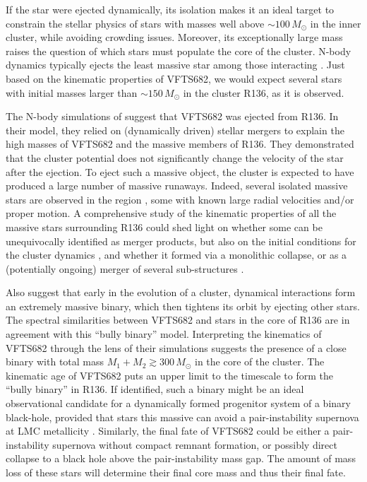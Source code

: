 \documentclass[a4paper,fleqn,usenatbib]{mnras}
\begin{document}
If the star were ejected dynamically, its isolation makes it an ideal target to constrain the stellar physics of
stars with masses well above $\sim$$100\,M_\odot$ in the inner
cluster, while avoiding
crowding issues. Moreover, 
 its exceptionally large mass raises the question of which stars must populate
the core of the cluster. N-body dynamics typically ejects the least
massive star among those interacting \cite[e.g.,][]{banerjee:12}. Just
based on the kinematic properties of VFTS682, we would expect several
stars with initial masses larger than $\sim$$150\,M_\odot$ in the
cluster R136, as it is observed.%

The N-body simulations of \citet{banerjee:12} suggest that VFTS682 was ejected from R136. In their
model, they relied on (dynamically driven) stellar mergers to explain the high masses of
VFTS682 and the massive members of R136. They
demonstrated that the cluster potential does not significantly change
the velocity of the star after the ejection.
To eject such a massive object, the cluster is
expected to have produced a large number of massive runaways. Indeed, several %
isolated massive stars are observed in the region \citep[][]{evans:10,lennon:18}, some with known
large radial velocities and/or proper motion. 
A comprehensive study of the kinematic
properties of all the massive stars surrounding R136 could shed light
on whether some can be unequivocally identified as merger products,
but also on the initial conditions for the cluster dynamics
\citep[e.g.,][]{oh:16}, and whether it formed via a monolithic collapse, or
as a (potentially ongoing) merger of several sub-structures \citep[e.g.,][]{sabbi:12}.

Also \cite{fujii:11} suggest that
early in the evolution of a cluster, dynamical interactions form an extremely
massive binary, which then tightens its orbit by ejecting other
stars. The spectral similarities between VFTS682 and stars in the core
of R136 are in agreement with this ``bully binary'' model. Interpreting the kinematics of VFTS682 through the lens of their simulations
suggests the presence of a close binary with total mass
$M_1+M_2\gtrsim 300\,M_\odot$ in the core of the cluster. The kinematic age of VFTS682 puts an
upper limit to the timescale to form the ``bully binary'' in
R136. If identified, such a binary %
might be an ideal observational candidate for a dynamically formed progenitor system of
a binary black-hole, provided that stars this massive can avoid a
pair-instability supernova \cite[e.g.,][]{rakavy:67} at LMC
metallicity \citep[see also][]{langer:07}.
Similarly, the final fate of VFTS682 could be either a
pair-instability supernova without compact remnant formation, or
possibly direct collapse to a black hole above the pair-instability
mass gap. The amount of mass loss of these stars will determine their final core
mass and thus their final fate.
\end{document}
